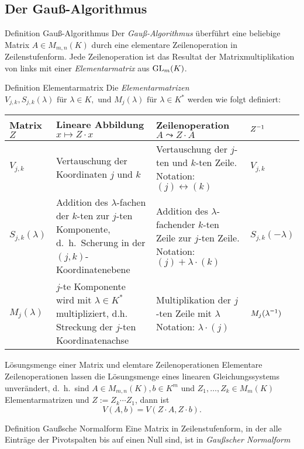 \documentclass[main.tex]{subfiles}
\begin{document}
\subsection*{Der Gauß-Algorithmus}
\begin{karte}{Definition Gauß-Algorithmus}
    Der \textit{Gauß-Algorithmus} überführt eine beliebige Matrix 
    \( A \in M_{m,n}(K) \) durch eine elementare Zeilenoperation 
    in Zeilenstufenform. Jede Zeilenoperation ist das Resultat der 
    Matrixmultiplikation von links mit einer \textit{Elementarmatrix} 
    aus \( \operatorname{GL}_m(K) \).
\end{karte}
\begin{karte}{Definition Elementarmatrix}
    Die \textit{Elementarmatrizen} \(V_{j,k}, S_{j,k}(\lambda) 
    \text{ für } \lambda \in K, \text{ und } M_j(\lambda) \text{ für }
    \lambda \in K^* \) werden wie folgt definiert:\\
    \begin{tabular}{p{1.75 cm}|p{4 cm}|p{4 cm}|p{1.5 cm}}
        Matrix \(Z\) & Lineare Abbildung\newline \(x \mapsto Z \cdot x\) & Zeilenoperation\newline \(A\leadsto Z \cdot A\) & \(\inverse{Z}\) \\ 
        \hline
        \(V_{j,k}\) & Vertauschung der Koordinaten \(j\) und \(k\) & Vertauschung der \(j\)-ten und \(k\)-ten Zeile. \newline Notation: \( (j) \leftrightarrow (k) \) & \(V_{j,k}\) \\
        \hline
        \(S_{j,k}(\lambda)\) & Addition des \(\lambda\)-fachen \newline der \(k\)-ten zur \(j\)-ten \newline Komponente, d.\ h.\ \newline Scherung in der \((j,k)\)-Koordinatenebene & Addition des \(\lambda\)-fachen\newline der \(k\)-ten Zeile zur \(j\)-ten Zeile. \newline Notation: \((j) + \lambda \cdot (k) \) & \(S_{j,k}(-\lambda)\) \\
        \hline
        \(M_j(\lambda)\) & \(j\)-te Komponente wird mit \( \lambda \in K^* \) multipliziert, d.h. Streckung der \(j\)-ten Koordinatenachse & Multiplikation der \(j\)-ten Zeile mit \(\lambda\) \newline Notation: \(\lambda \cdot (j) \) & \(M_j(\inverse{\lambda})\)
    \end{tabular}
\end{karte}
\begin{karte}{Lösungsmenge einer Matrix und elemtare Zeilenoperationen}
    Elementare Zeilenoperationen lassen die Lösungsmenge eines 
    linearen Gleichungssystems unverändert, d.\ h.\ sind 
    \( A \in M_{m,n}(K), b \in K^m \) und \( Z_1,\ldots, Z_k \in M_m(K) \)
    Elementarmatrizen und \( Z := Z_k \cdots Z_1 \), dann ist 
    \[ V(A,b) = V(Z \cdot A, Z \cdot b). \]
\end{karte}
\begin{karte}{Definition Gaußsche Normalform}
    Eine Matrix in Zeilenstufenform, in der alle Einträge der 
    Pivotspalten bis auf einen Null sind, ist in 
    \textit{Gaußscher Normalform}
\end{karte}
\end{document}
